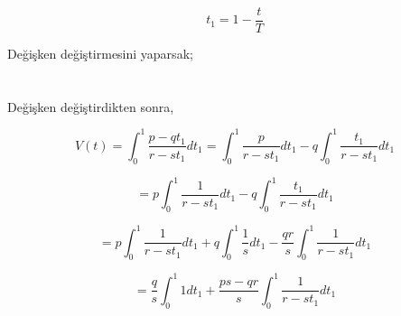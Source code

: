 \documentclass[a4paper,10pt]{article}
\begin{document}
 \[
  t_1 = 1 - \frac{t}{T}
 \]
 
    Değişken değiştirmesini yaparsak;
    
\section{}

Değişken değiştirdikten sonra,

\[
 V(t) = \int_0^1\frac{p-qt_1}{r-st_1} dt_1 = \int_0^1\frac{p}{r-st_1} dt_1 - q \int_0^1\frac{t_1}{r-st_1} dt_1
\]

\[ 
 = p\int_0^1\frac{1}{r-st_1} dt_1 - q \int_0^1\frac{t_1}{r-st_1}dt_1
\]

\[ 
 = p\int_0^1\frac{1}{r-st_1} dt_1 +q \int_0^1\frac{1}{s} dt_1 -\frac{qr}{s}\int_0^1\frac{1}{r-st_1} dt_1
\]

\[
 = \frac{q}{s}\int_0^1{1}dt_1 + \frac{ps-qr}{s}\int_0^1\frac{1}{r-st_1} dt_1
\]
\end{document}
